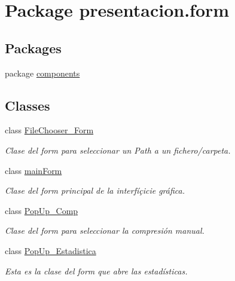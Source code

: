 \hypertarget{namespacepresentacion_1_1form}{}\section{Package presentacion.\+form}
\label{namespacepresentacion_1_1form}
\subsection*{Packages}
\begin{DoxyCompactItemize}
\item 
package \hyperlink{namespacepresentacion_1_1form_1_1components}{components}
\end{DoxyCompactItemize}
\subsection*{Classes}
\begin{DoxyCompactItemize}
\item 
class \hyperlink{classpresentacion_1_1form_1_1FileChooser__Form}{File\+Chooser\+\_\+\+Form}
\begin{DoxyCompactList}\small\item\em Clase del form para seleccionar un Path a un fichero/carpeta. \end{DoxyCompactList}\item 
class \hyperlink{classpresentacion_1_1form_1_1mainForm}{main\+Form}
\begin{DoxyCompactList}\small\item\em Clase del form principal de la interfíçicie gráfica. \end{DoxyCompactList}\item 
class \hyperlink{classpresentacion_1_1form_1_1PopUp__Comp}{Pop\+Up\+\_\+\+Comp}
\begin{DoxyCompactList}\small\item\em Clase del form para seleccionar la compresión manual. \end{DoxyCompactList}\item 
class \hyperlink{classpresentacion_1_1form_1_1PopUp__Estadistica}{Pop\+Up\+\_\+\+Estadistica}
\begin{DoxyCompactList}\small\item\em Esta es la clase del form que abre las estadísticas. \end{DoxyCompactList}\end{DoxyCompactItemize}
